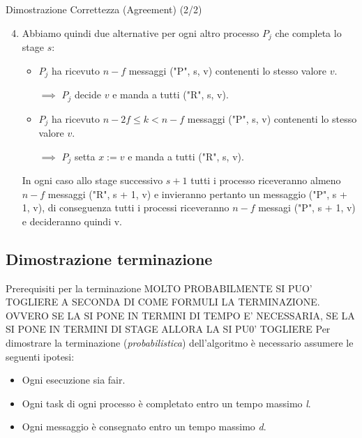\documentclass{beamer}
\begin{document}
\begin{frame}{Dimostrazione Correttezza (Agreement) (2/2)}
    \begin{enumerate}
        \setcounter{enumi}{3}
        \item Abbiamo quindi due alternative per ogni altro processo $P_{j}$ che completa lo stage $s$:
        \begin{itemize}
            \item $P_{j}$ ha ricevuto $n - f$ messaggi ("P", s, v) contenenti lo stesso valore $v$.
            \begin{addmargin}[1em]{2em}
            $\implies$ $P_{j}$ decide $v$ e manda a tutti ("R", s, v). 
            \end{addmargin}
            
            \item $P_{j}$ ha ricevuto $n - 2f \leq k < n - f$ messaggi ("P", s, v) contenenti lo stesso valore $v$.
            \begin{addmargin}[1em]{2em}
            $\implies$ $P_{j}$ setta $x := v$ e manda a tutti ("R", s, v). 
            \end{addmargin}
        \end{itemize}
        
        In ogni caso allo stage successivo $s + 1$ tutti i processo riceveranno almeno $n - f$ messaggi ("R", s + 1, v) e invieranno pertanto un messaggio ("P", s + 1, v), di conseguenza tutti i processi riceveranno $n - f$ messagi ("P", s + 1, v) e decideranno quindi v.
    \end{enumerate}
\end{frame}

\subsection{Dimostrazione terminazione}
\begin{frame}{Prerequisiti per la terminazione}
    MOLTO PROBABILMENTE SI PUO' TOGLIERE A SECONDA DI COME FORMULI LA TERMINAZIONE.
    OVVERO SE LA SI PONE IN TERMINI DI TEMPO E' NECESSARIA, SE LA SI PONE IN TERMINI DI STAGE ALLORA LA SI PU0' TOGLIERE
    Per dimostrare la terminazione (\textit{probabilistica}) dell'algoritmo è necessario assumere le seguenti ipotesi:  
    \begin{itemize}
        \item Ogni esecuzione sia fair.
        \item Ogni task di ogni processo è completato entro un tempo massimo \textit{l}.
        \item Ogni messaggio è consegnato entro un tempo massimo \textit{d}.
    \end{itemize}
\end{frame}
\end{document}
